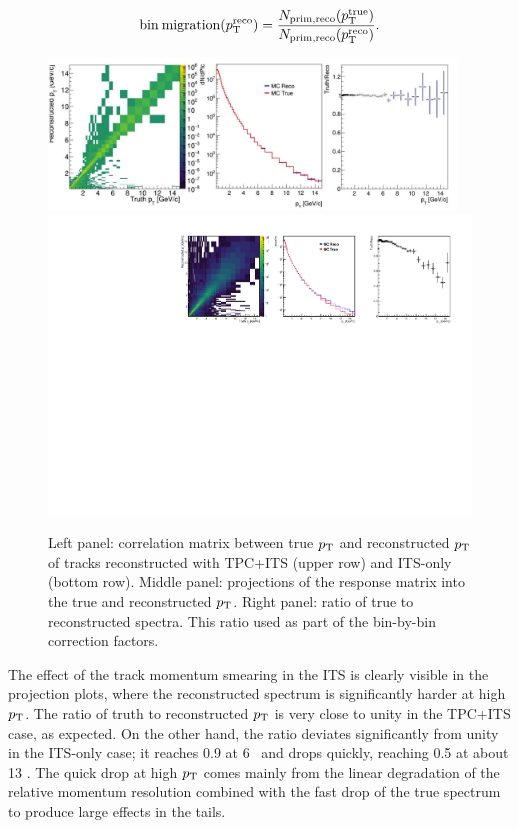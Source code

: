 \begin{equation}\label{eq:bin_migration}
\mathrm{bin\:migration} (p_{\mathrm{T}}^{\mathrm{reco}}) = \frac{N_{\mathrm{prim,reco}}(p_{\mathrm{T}}^{\mathrm{true}})}{N_{\mathrm{prim,reco}}(p_{\mathrm{T}}^{\mathrm{reco}})}.
\end{equation}

\begin{figure}[h!]
\includegraphics[width=0.965\textwidth]{Tracking/Matrix_tracking_tpc_MBMC_0GeV15GeV_dNdPt.pdf}\\
\includegraphics[width=1.0\textwidth]{Tracking/Matrix_tracking_its_MBMC_0GeV15GeV_dNdPt.pdf}

\caption{Left panel: correlation matrix between true $p_{\mathrm{T}}$ and reconstructed $p_{\mathrm{T}}$ of tracks reconstructed with TPC+ITS (upper row) and ITS-only (bottom row). Middle panel: projections of the response matrix into the true and reconstructed $p_{\mathrm{T}}$. Right panel: ratio of true to reconstructed spectra. This ratio used as part of the bin-by-bin correction factors.}
\label{fig:responseMatrixTPC}
\end{figure}

The effect of the track momentum smearing in the ITS is clearly visible in the projection plots, where the reconstructed spectrum is significantly harder at high $p_{\mathrm{T}}$. The ratio of truth to reconstructed $p_{\mathrm{T}}$ is very close to unity in the TPC+ITS case, as expected. On the other hand, the ratio deviates significantly from unity in the ITS-only case; it reaches 0.9 at 6 \GeVc~and drops quickly, reaching 0.5 at about 13 \GeVc. The quick drop at high $p_{\mathrm{T}}$ comes mainly from the linear degradation of the relative momentum resolution combined with the fast drop of the true spectrum to produce large effects in the tails. 

